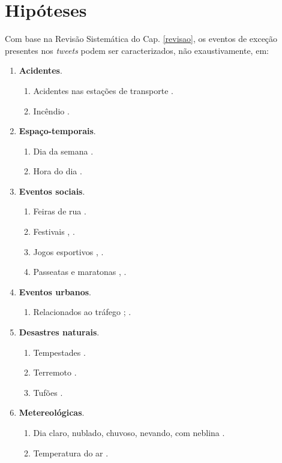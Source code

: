 \documentclass[
	12pt,				%
	oneside,			%
	a4paper,			%
	english,			%
	brazil				%
	]{abntex2ppgsi}
\begin{document}
\section{Hipóteses}
\label{hipoteses}

Com base na Revisão Sistemática do Cap. \ref{revisao}, os eventos de exceção presentes nos \textit{tweets} podem ser caracterizados, não exaustivamente, em:

\begin{enumerate}
\item \textbf{Acidentes}.
\begin{enumerate}
\item Acidentes nas estações de transporte \cite{Itoh2016}.
\item Incêndio \cite{Itoh2016}.
\end{enumerate}

\item \textbf{Espaço-temporais}.
\begin{enumerate}
\item Dia da semana \cite{Chen2016}.
\item Hora do dia \cite{Chen2016}.
\end{enumerate}

\item \textbf{Eventos sociais}.
\begin{enumerate}
\item Feiras de rua \cite{Chen2016}.
\item Festivais \cite{Chen2016}, \cite{Lecue2014}.
\item Jogos esportivos \cite{Chen2016}, \cite{Gal-Tzur2014}.
\item Passeatas e maratonas \cite{Chen2016}, \cite{Itoh2016}.
\end{enumerate}

\item \textbf{Eventos urbanos}.
\begin{enumerate}
\item Relacionados ao tráfego \cite{Chen2016}; \cite{Lecue2014}.
\end{enumerate}

\item \textbf{Desastres naturais}.
\begin{enumerate}
\item Tempestades \cite{Itoh2016}.
\item Terremoto \cite{Itoh2016}.
\item Tufões \cite{Itoh2016}.
\end{enumerate}

\item \textbf{Metereológicas}.
\begin{enumerate}
\item Dia claro, nublado, chuvoso, nevando, com neblina \cite{Chen2016}.
\item Temperatura do ar \cite{Chen2016}.
\end{enumerate}

\end{enumerate}
\end{document}
